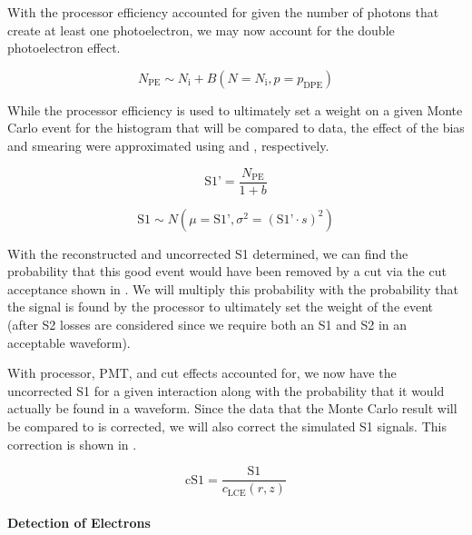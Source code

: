 With the processor efficiency accounted for given the number of photons that create at least one photoelectron, we may now account for the double photoelectron effect.  

\begin{equation}
        N_{\textrm{PE}} \sim N_{\textrm{i}} + B(N=N_{\textrm{i}}, p=p_{\textrm{DPE}})
\end{equation}


While the processor efficiency is used to ultimately set a weight on a given Monte Carlo event for the histogram that will be compared to data, the effect of the bias and smearing were approximated using  and , respectively.  

\begin{equation}
        \label{eqn:xe1t_s1_bias}
        \textrm{S1'} = \frac{N_{\textrm{PE}}}{1 + b}
\end{equation}


\begin{equation}
        \label{eqn:xe1t_s1_smearing}
        \textrm{S1} \sim N(\mu = \textrm{S1'}, \sigma^2 = (\textrm{S1'} \cdot s)^2)
\end{equation}


With the reconstructed and uncorrected S1 determined, we can find the probability that this good event would have been removed by a cut via the cut acceptance shown in .  We will multiply this probability with the probability that the signal is found by the processor to ultimately set the weight of the event (after S2 losses are considered since we require both an S1 and S2 in an acceptable waveform).


With processor, PMT, and cut effects accounted for, we now have the uncorrected S1 for a given interaction along with the probability that it would actually be found in a waveform.  Since the data that the Monte Carlo result will be compared to is corrected, we will also correct the simulated S1 signals.  This correction is shown in . 

\begin{equation}
        \label{eqn:xe1t_s1_recorrect}
        \textrm{cS1} = \frac{\textrm{S1}}{c_{\textrm{LCE}}(r, z)}
\end{equation}




\paragraph{Detection of Electrons}
\label{sec:xe1t_mc_electrons}


